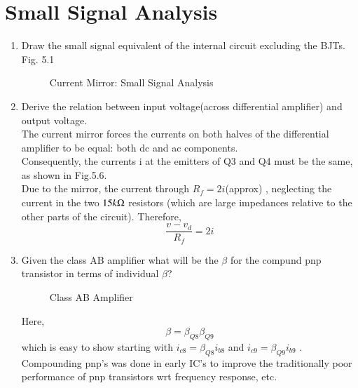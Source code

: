 \documentclass[journal,12pt,twocolumn]{IEEEtran}
\renewcommand\thesection{\arabic{section}}
\begin{document}
\section{Small Signal Analysis}
\begin{enumerate}[label=\thesection.\arabic*,ref=\thesection.\theenumi]
\item Draw the small signal equivalent of the internal circuit excluding the BJTs.\\

\solution Fig. 5.1

\begin{figure}[!ht]
\centering	
\resizebox{\columnwidth}{!}{}
\caption{Current Mirror: Small Signal Analysis}
\label{fig:smallsig}	
\end{figure}

\item Derive the relation between input voltage(across differential amplifier) and output voltage.\\
\solution
The current mirror forces the currents on both halves of the
differential amplifier to be equal: both dc and ac components.\\
Consequently, the currents i at the emitters of Q3 and Q4 must
be the same, as shown in Fig.5.6.\\ Due to the mirror, the current through $R_{f} = 2 i$(approx) , neglecting the current in the two $15k\ohm$ resistors (which are large impedances
relative to the other parts of the circuit). Therefore,\\
$$\frac{v-v_{d}}{R_{f}}=2i$$   

\item Given the class AB amplifier what will be the $\beta$ for the compund pnp transistor in terms of individual $\beta$?

\begin{figure}[!ht]
\centering	
\resizebox{\columnwidth}{!}{}
\caption{Class AB Amplifier}
\label{fig:classab}	
\end{figure}
% 
%
\solution
Here,
$$\beta = \beta_{Q8} \beta_{Q9}$$  which is easy to show starting with
$i_{c8}=\beta_{Q8}i_{b8}$ and $i_{c9}=\beta_{Q9}i_{b9}$ . Compounding pnp’s was done in
early IC’s to improve the traditionally poor performance of pnp
transistors wrt frequency response, etc. 


\end{enumerate}
\end{document}
